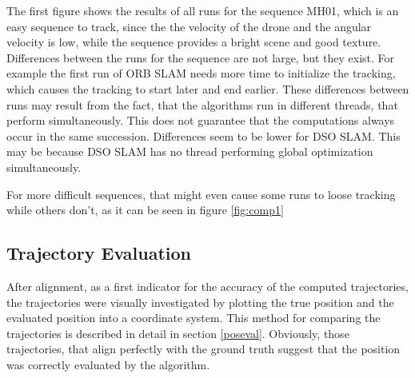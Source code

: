 The first figure shows the results of all runs for the sequence MH01, which is an easy sequence to track, since the the velocity of the drone and the 
angular velocity is low, while the sequence provides a bright scene and good texture. Differences between the runs for the sequence are not large, but they exist. 
For example the first run of ORB SLAM needs more time to initialize the tracking, which causes the tracking to start later and end earlier. These differences between runs
may result from the fact, that the algorithms run in different threads, that perform simultaneously. This does not guarantee that the computations always occur in the same succession. 
Differences seem to be lower for DSO SLAM. This may be because DSO SLAM has no thread performing global optimization simultaneously. 


For more difficult sequences, that might even cause some runs to loose tracking while others don't, as it can be seen in figure \ref{fig:comp1}

\subsection{Trajectory Evaluation}

	After alignment, as a first indicator for the accuracy of the computed trajectories, the trajectories were visually investigated by 
	plotting the true position and the evaluated position into a coordinate system. This method 
    for comparing the trajectories is described in detail in section \ref{poseval}. Obviously, those trajectories, that align perfectly with the ground truth
	suggest that the position was correctly evaluated by the algorithm. 
	


